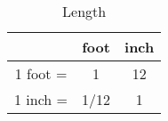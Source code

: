 \begin{table}[h]
  \centering
  \label{table:length-convrsion}

  \begin{tabular}{ | c | c | c |}
    \hline
              &   foot    &   inch  \\
    \hline
    1 foot =  &   1       &   12    \\
    1 inch =  &   1/12    &   1     \\
    \hline
  \end{tabular}

  \caption{Length}
\end{table}
